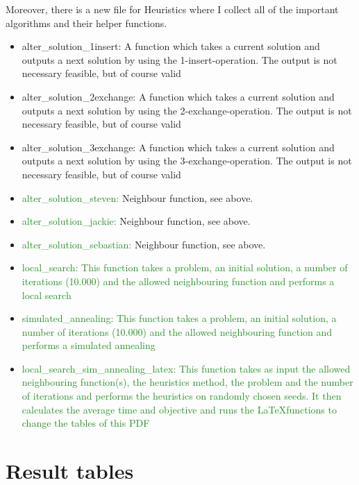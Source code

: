 \documentclass[a4paper,11pt]{article}
\theoremstyle{mytheor}
\begin{document}
\clearpage
Moreover, there is a new file for Heuristics where I collect all of the important algorithms and their helper functions.
\begin{itemize}
\item alter\_solution\_1insert: A function which takes a current solution and outputs a next solution by using the 1-insert-operation. The output is not necessary feasible, but of course valid
\item alter\_solution\_2exchange: A function which takes a current solution and outputs a next solution by using the 2-exchange-operation. The output is not necessary feasible, but of course valid
\item alter\_solution\_3exchange: A function which takes a current solution and outputs a next solution by using the 3-exchange-operation. The output is not necessary feasible, but of course valid
\item \textcolor{ForestGreen}{alter\_solution\_steven: }Neighbour function, see above.
\item \textcolor{ForestGreen}{alter\_solution\_jackie: }Neighbour function, see above.
\item \textcolor{ForestGreen}{alter\_solution\_sebastian: }Neighbour function, see above.


\item \textcolor{ForestGreen}{local\_search: This function takes a problem, an initial solution, a number of iterations (10.000) and the allowed neighbouring function and performs a local search}
\item \textcolor{ForestGreen}{simulated\_annealing: This function takes a problem, an initial solution, a number of iterations (10.000) and the allowed neighbouring function and performs a simulated annealing}
\item \textcolor{ForestGreen}{local\_search\_sim\_annealing\_latex: This function takes as input the allowed neighbouring function(s), the heuristics method, the problem and the number of iterations and performs the heuristics on randomly chosen seeds. It then calculates the average time and objective and runs the \LaTeX functions to change the tables of this PDF}
\end{itemize}

\clearpage

\section{Result tables}

\end{document}
